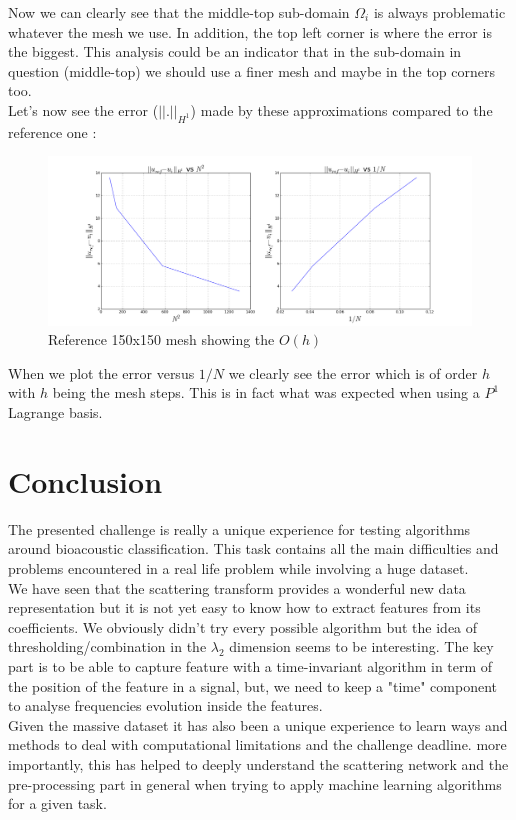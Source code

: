 \documentclass[a4paper]{report}
\begin{document}
Now we can clearly see that the middle-top sub-domain $\Omega_i$ is always problematic whatever the mesh we use. In addition, the top left corner is where the error is the biggest. This analysis could be an indicator that in the sub-domain in question (middle-top) we should use a finer mesh and maybe in the top corners too.
\\
Let's now see the error ($||.||_{H^1}$) made by these approximations compared to the reference one :

\begin{figure}[H]
\begin{center}
\includegraphics[scale=0.25]{error_h.png}\caption{Reference 150x150 mesh showing the $O(h)$}
\end{center}
\end{figure}
When we plot the error versus $1/N$ we clearly see the error which is of order $h$ with $h$ being the mesh steps. This is in fact what was expected when using a $P^1$ Lagrange basis. 
\section{Conclusion}


The presented challenge is really a unique experience for testing algorithms around bioacoustic classification. This task contains all the main difficulties and problems encountered in a real life problem while involving a huge dataset. 
\\
We have seen that the scattering transform provides a wonderful new data representation but it is not yet easy to know how to extract features from its coefficients. We obviously didn't try every possible algorithm but the idea of thresholding/combination in the $\lambda_2$ dimension seems to be interesting. The key part is to be able to capture feature with a time-invariant algorithm in term of the position of the feature in a signal, but, we need to keep a "time" component to analyse frequencies evolution inside the features.
\\

Given the massive dataset it has also been a unique experience to learn ways and methods to deal with computational limitations and the challenge deadline.
more importantly, this has helped to deeply understand the scattering network and the pre-processing part in general when trying to apply machine learning algorithms for a given task.




\nocite{*}
\end{document}
